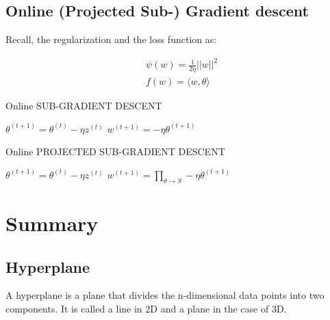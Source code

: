 \documentclass[11pt]{article}
\begin{document}
        
\subsection{Online (Projected Sub-) Gradient descent}
Recall, the regularization and the loss function as:

	\begin{equation}
	\begin{aligned}
    &\psi(w) = \frac{1}{2\eta} ||w||^2 \\
	&f(w) = \langle w, \theta \rangle
    \end{aligned}
	\end{equation}
	
	\begin{algorithm}
	\caption{Online SUB-GRADIENT DESCENT}
    \begin{algorithmic}[1]
    \STATE $\theta^{(t+1)}  = \theta^{(t)} -\eta z^{(t)} $ 
    \STATE $w^{(t+1)} = -\eta \theta^{(t+1)}$ 
    \ENDFOR
    \end{algorithmic}
	\end{algorithm}


	\begin{algorithm}
	\caption{Online PROJECTED SUB-GRADIENT DESCENT}
    \begin{algorithmic}[1]
    \STATE $\theta^{(t+1)}  = \theta^{(t)} -\eta z^{(t)} $ 
    \STATE $w^{(t+1)} = \prod_{\theta \to S}-\eta \theta^{(t+1)}$ 
    \ENDFOR
    \end{algorithmic}
	\end{algorithm}

\section{Summary}

\subsection{Hyperplane}
A hyperplane is a plane that divides the n-dimensional data points into two components. It is called a line in 2D and a plane in the case of 3D.
\end{document}
